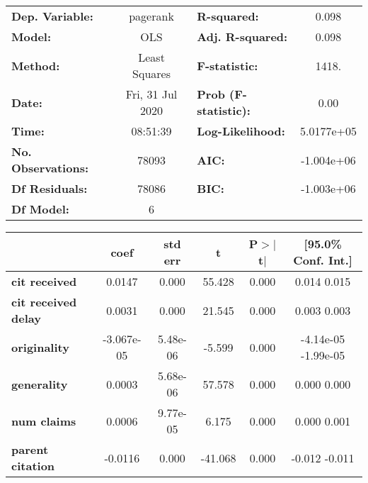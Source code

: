 \begin{center}
\begin{tabular}{lclc}
\toprule
\textbf{Dep. Variable:}     &     pagerank     & \textbf{  R-squared:         } &       0.098    \\
\textbf{Model:}             &       OLS        & \textbf{  Adj. R-squared:    } &       0.098    \\
\textbf{Method:}            &  Least Squares   & \textbf{  F-statistic:       } &       1418.    \\
\textbf{Date:}              & Fri, 31 Jul 2020 & \textbf{  Prob (F-statistic):} &       0.00     \\
\textbf{Time:}              &     08:51:39     & \textbf{  Log-Likelihood:    } &   5.0177e+05   \\
\textbf{No. Observations:}  &       78093      & \textbf{  AIC:               } &   -1.004e+06   \\
\textbf{Df Residuals:}      &       78086      & \textbf{  BIC:               } &   -1.003e+06   \\
\textbf{Df Model:}          &           6      & \textbf{                     } &                \\
\bottomrule
\end{tabular}
\begin{tabular}{lccccc}
                            & \textbf{coef} & \textbf{std err} & \textbf{t} & \textbf{P$>$$|$t$|$} & \textbf{[95.0\% Conf. Int.]}  \\
\midrule
\textbf{cit received}       &       0.0147  &        0.000     &    55.428  &         0.000        &         0.014     0.015       \\
\textbf{cit received delay} &       0.0031  &        0.000     &    21.545  &         0.000        &         0.003     0.003       \\
\textbf{originality}        &   -3.067e-05  &     5.48e-06     &    -5.599  &         0.000        &     -4.14e-05 -1.99e-05       \\
\textbf{generality}         &       0.0003  &     5.68e-06     &    57.578  &         0.000        &         0.000     0.000       \\
\textbf{num claims}         &       0.0006  &     9.77e-05     &     6.175  &         0.000        &         0.000     0.001       \\
\textbf{parent citation}    &      -0.0116  &        0.000     &   -41.068  &         0.000        &        -0.012    -0.011       \\

\end{tabular}
\end{center}
